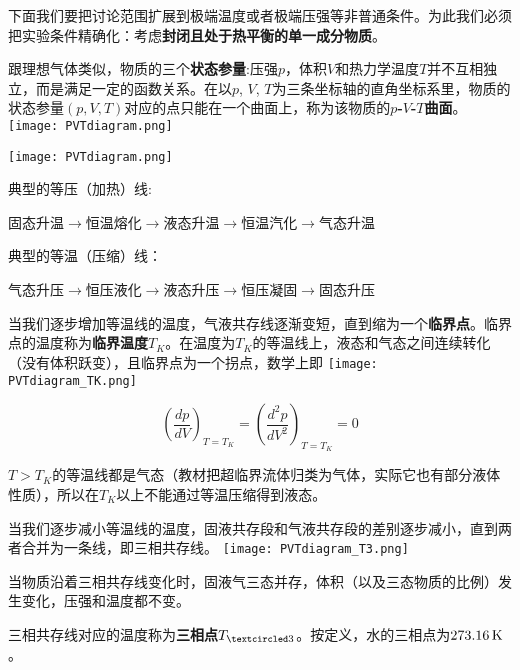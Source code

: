 \documentclass[CJK]{beamer}
\begin{document}
\begin{frame}
\bch
\bitem
\item{下面我们要把讨论范围扩展到极端温度或者极端压强等非普通条件。为此我们必须把实验条件精确化：考虑{\bf 封闭且处于热平衡的单一成分物质}。}
\item{
跟理想气体类似，物质的三个{\bf 状态参量}:压强$p$，体积$V$和热力学温度$T$并不互相独立，而是满足一定的函数关系。在以$p$, $V$, $T$为三条坐标轴的直角坐标系里，物质的状态参量$(p, V, T)$对应的点只能在一个曲面上，称为该物质的{\bf $p$-$V$-$T$曲面}。
\emini
{}
\texttt{[image: PVTdiagram.png]}
\emini
}
\eitem
\ech
\end{frame}

\begin{frame}
\bch
{}
\texttt{[image: PVTdiagram.png]}
\emini
{}
{\small

\bitem
\item{典型的等压（加热）线:

 固态升温$\rightarrow$恒温熔化$\rightarrow$液态升温$\rightarrow$恒温汽化$\rightarrow$气态升温}

\item{典型的等温（压缩）线：

气态升压$\rightarrow$恒压液化$\rightarrow$液态升压$\rightarrow$恒压凝固$\rightarrow$固态升压

}
\eitem
}
\emini
\ech
\end{frame}


\begin{frame}
\bch
\bitem
\item{\small 当我们逐步增加等温线的温度，气液共存线逐渐变短，直到缩为一个{\bf 临界点}。临界点的温度称为{\bf 临界温度$T_K$}。在温度为$T_K$的等温线上，液态和气态之间连续转化（没有体积跃变），且临界点为一个拐点，数学上即}
\eitem
{}
\texttt{[image: PVTdiagram\_TK.png]}
\emini
{}
{\small
$$\left(\frac{d p}{d V}\right)_{T=T_K} = \left(\frac{d^2 p}{d V^2}\right)_{T=T_K} = 0$$ 
\bitem
\item{$T>T_K$的等温线都是气态{\scriptsize（教材把超临界流体归类为气体，实际它也有部分液体性质）}，所以在$T_K$以上不能通过等温压缩得到液态。}
\eitem
}
\emini
\ech
\end{frame}

\begin{frame}
\bch
\bitem
\item{\small 当我们逐步减小等温线的温度，固液共存段和气液共存段的差别逐步减小，直到两者合并为一条线，即三相共存线。}
\eitem
{}
\texttt{[image: PVTdiagram\_T3.png]}
\emini
{}
{\small
\bitem
\item{当物质沿着三相共存线变化时，固液气三态并存，体积（以及三态物质的比例）发生变化，压强和温度都不变。}
\item{三相共存线对应的温度称为{\bf 三相点$\Tthree$}。按定义，水的三相点为$273.16\,\mathrm{K}$。}
\eitem
}
\emini
\ech
\end{frame}
\end{document}
